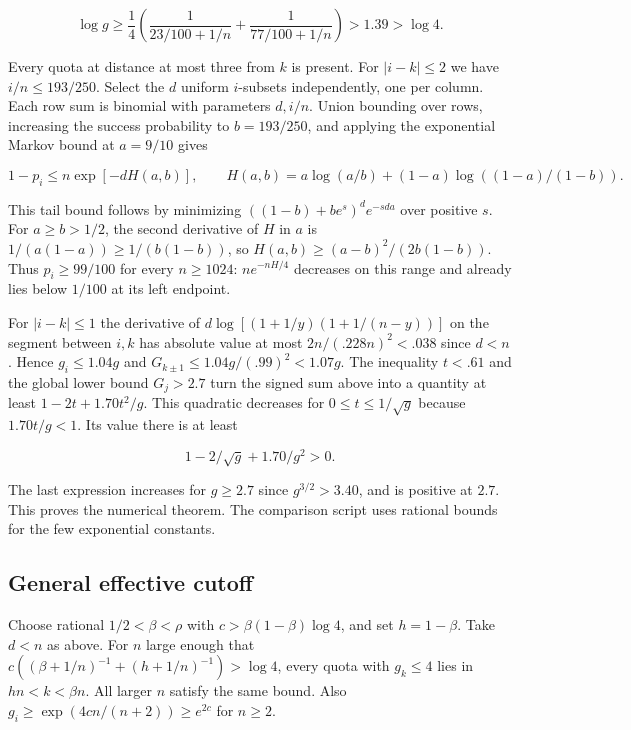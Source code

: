 \documentclass[11pt]{article}
\begin{document}
\begin{equation*}
\log g\ge \frac14\left(\frac1{23/100+1/n}+\frac1{77/100+1/n}\right)>1.39>\log4.
\end{equation*}

Every quota at distance at most three from $k$ is present. For $|i-k|\le2$ we have $i/n\le193/250$. Select the $d$ uniform $i$-subsets independently, one per column. Each row sum is binomial with parameters $d,i/n$. Union bounding over rows, increasing the success probability to $b=193/250$, and applying the exponential Markov bound at $a=9/10$ gives

\begin{equation*}
1-p_i\le n\exp[-d H(a,b)], \qquad
H(a,b)=a\log(a/b)+(1-a)\log((1-a)/(1-b)).
\end{equation*}

This tail bound follows by minimizing $((1-b)+b e^s)^d e^{-sda}$ over positive $s$. For $a\ge b>1/2$, the second derivative of $H$ in $a$ is $1/(a(1-a))\ge1/(b(1-b))$, so $H(a,b)\ge(a-b)^2/(2b(1-b))$. Thus $p_i\ge99/100$ for every $n\ge1024$: $n e^{-nH/4}$ decreases on this range and already lies below $1/100$ at its left endpoint.

For $|i-k|\le1$ the derivative of $d\log[(1+1/y)(1+1/(n-y))]$ on the segment between $i,k$ has absolute value at most $2n/(.228n)^2<.038$ since $d<n$. Hence $g_i\le1.04g$ and $G_{k\pm1}\le1.04g/(.99)^2<1.07g$. The inequality $t<.61$ and the global lower bound $G_j>2.7$ turn the signed sum above into a quantity at least $1-2t+1.70t^2/g$. This quadratic decreases for $0\le t\le1/\sqrt g$ because $1.70t/g<1$. Its value there is at least

\begin{equation*}
1-2/\sqrt g+1.70/g^2>0.
\end{equation*}

The last expression increases for $g\ge2.7$ since $g^{3/2}>3.40$, and is positive at $2.7$. This proves the numerical theorem. The comparison script uses rational bounds for the few exponential constants.

\subsection{General effective cutoff}

Choose rational $1/2<\beta<\rho$ with $c>\beta(1-\beta)\log4$, and set $h=1-\beta$. Take $d<n$ as above. For $n$ large enough that $c((\beta+1/n)^{-1}+(h+1/n)^{-1})>\log4$, every quota with $g_k\le4$ lies in $hn<k<\beta n$. All larger $n$ satisfy the same bound. Also $g_i\ge\exp(4cn/(n+2))\ge e^{2c}$ for $n\ge2$.
\end{document}
